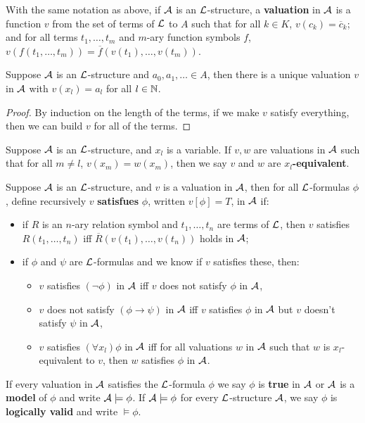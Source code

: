 \documentclass{article}
\begin{document}
\begin{definition}
    With the same notation as above, if $\mathcal{A}$ is an $\mathcal{L}$-structure, a \textbf{valuation} in $\mathcal{A}$ is a function $v$ from the set of terms of $\mathcal{L}$ to $A$ such that for all $k\in K$, $v(c_k)=\overline{c}_k$; and for all terms $t_1,\ldots,t_m$ and $m$-ary function symbols $f$, $v(f(t_1,\ldots,t_m)) = \overline{f}(v(t_1),\ldots,v(t_m))$.
\end{definition}

\begin{lemma}
    Suppose $\mathcal{A}$ is an $\mathcal{L}$-structure and $a_0,a_1,\ldots\in A$, then there is a unique valuation $v$ in $\mathcal{A}$ with $v(x_l)=a_l$ for all $l\in\mathbb{N}$.

    \begin{proof}
        By induction on the length of the terms, if we make $v$ satisfy everything, then we can build $v$ for all of the terms.
    \end{proof}
\end{lemma}

\begin{definition}
    Suppose $\mathcal{A}$ is an $\mathcal{L}$-structure, and $x_l$ is a variable. If $v,w$ are valuations in $\mathcal{A}$ such that for all $m\neq l$, $v(x_m)=w(x_m)$, then we say $v$ and $w$ are \textbf{$x_l$-equivalent}.
\end{definition}

\begin{definition}
    Suppose $\mathcal{A}$ is an $\mathcal{L}$-structure, and $v$ is a valuation in $\mathcal{A}$, then for all $\mathcal{L}$-formulas $\phi$, define recursively $v$ \textbf{satisfues} $\phi$, written $v[\phi]=T$, in $\mathcal{A}$ if: \begin{itemize}
        \item if $R$ is an $n$-ary relation symbol and $t_1,\ldots,t_n$ are terms of $\mathcal{L}$, then $v$ satisfies $R(t_1,\ldots,t_n)$ iff $\overline{R}(v(t_1),\ldots,v(t_n))$ holds in $\mathcal{A}$;
        \item if $\phi$ and $\psi$ are $\mathcal{L}$-formulas and we know if $v$ satisfies these, then: \begin{itemize}
            \item $v$ satisfies $(\neg\phi)$ in $\mathcal{A}$ iff $v$ does not satisfy $\phi$ in $\mathcal{A}$,
            \item $v$ does not satisfy $(\phi\rightarrow\psi)$ in $\mathcal{A}$ iff $v$ satisfies $\phi$ in $\mathcal{A}$ but $v$ doesn't satisfy $\psi$ in $\mathcal{A}$,
            \item $v$ satisfies $(\forall x_l)\phi$ in $\mathcal{A}$ iff for all valuations $w$ in $\mathcal{A}$ such that $w$ is $x_l$-equivalent to $v$, then $w$ satisfies $\phi$ in $\mathcal{A}$.
        \end{itemize}
    \end{itemize}
    If every valuation in $\mathcal{A}$ satisfies the $\mathcal{L}$-formula $\phi$ we say $\phi$ is \textbf{true} in $\mathcal{A}$ or $\mathcal{A}$ is a \textbf{model} of $\phi$ and write $\mathcal{A}\models\phi$. If $\mathcal{A}\models\phi$ for every $\mathcal{L}$-structure $\mathcal{A}$, we say $\phi$ is \textbf{logically valid} and write $\models\phi$.
\end{definition}
\end{document}
